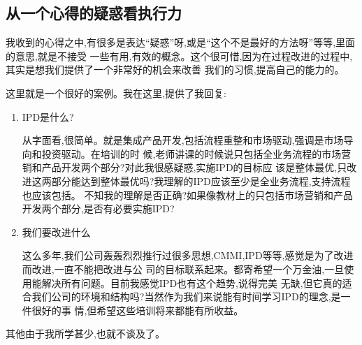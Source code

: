 \documentclass[11pt]{article}
\begin{document}
\subsection{从一个心得的疑惑看执行力}
\begin{statement}
  我收到的心得之中,有很多是表达``疑惑''呀,或是``这个不是最好的方法呀''等等,里面的意思,就是不接受
  一些有用,有效的概念。这个很可惜,因为在过程改进的过程中,其实是想我们提供了一个非常好的机会来改善
  我们的习惯,提高自己的能力的。

  这里就是一个很好的案例。我在这里,提供了我回复:
\end{statement}

\begin{myquote}
\begin{enumerate}
  \item IPD是什么?

    从字面看,很简单。就是集成产品开发,包括流程重整和市场驱动,强调是市场导向和投资驱动。在培训的时
    候,老师讲课的时候说只包括全业务流程的市场营销和产品开发两个部分?对此我很感疑惑,实施IPD的目标应
    该是整体最优,只改进这两部分能达到整体最优吗?我理解的IPD应该至少是全业务流程,支持流程也应该包括。
    不知我的理解是否正确?如果像教材上的只包括市场营销和产品开发两个部分,是否有必要实施IPD?

  \item 我们要改进什么

    这么多年,我们公司轰轰烈烈推行过很多思想,CMMI,IPD等等,感觉是为了改进而改进,一直不能把改进与公
    司的目标联系起来。都寄希望一个万金油,一旦使用能解决所有问题。目前我感觉IPD也有这个趋势,说得完美
    无缺,但它真的适合我们公司的环境和结构吗?当然作为我们来说能有时间学习IPD的理念,是一件很好的事
    情,但希望这些培训将来都能有所收益。
\end{enumerate}

其他由于我所学甚少,也就不谈及了。
\end{myquote}
\end{document}
